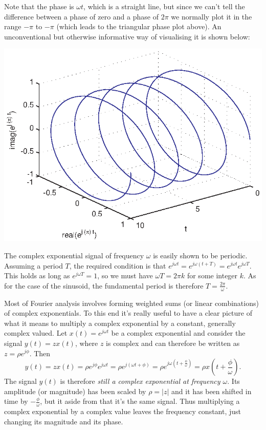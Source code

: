 \documentclass[10pt]{beamer}
\begin{document}
Note that the phase is $\omega t$, which is a straight line, but since we can't tell the difference between a phase of zero and a phase of $2 \pi$ we normally plot it in the range $-\pi$ to $-\pi$ (which leads to the triangular phase plot above).  An unconventional but otherwise informative way of visualising it is shown below:
\begin{center}
  \includegraphics{complexexpplot3} 
\end{center}

The complex exponential signal of frequency $\omega$ is easily shown to be periodic.  Assuming a period $T$, the required condition is that $e^{j \omega t} = e^{j \omega (t + T)} = e^{j \omega t} e^{j \omega T}$.  This holds as long as $e^{j \omega T} = 1$, so we must have $\omega T = 2 \pi k$ for some integer $k$.  As for the case of the sinusoid, the fundamental period is therefore $T = \frac{2 \pi}{\omega}$.

Most of Fourier analysis involves forming weighted sums (or linear combinations) of complex exponentials.  To this end it's really useful to have a clear picture of what it means to multiply a complex exponential by a constant, generally complex valued.  Let $x(t) = e^{j \omega t}$ be a complex exponential and consider the signal $y(t) = z x(t)$, where $z$ is complex and can therefore be written as $z = \rho e^{j \phi}$.  Then
\begin{equation*}
  y(t) = z x(t) = \rho e^{j \phi} e^{j \omega t} = \rho e^{j (\omega t + \phi)}
  = \rho e^{j \omega (t + \frac{\phi}{\omega})} = \rho x(t + \frac{\phi}{\omega}).
\end{equation*}
The signal $y(t)$ is therefore {\em still a complex exponential at frequency $\omega$}.  Its amplitude (or magnitude) has been scaled by $\rho = |z|$ and it has been shifted in time by $-\frac{\phi}{\omega}$, but it aside from that it's the same signal.  Thus multiplying a complex exponential by a complex value leaves the frequency constant, just changing its magnitude and its phase.
\end{document}
